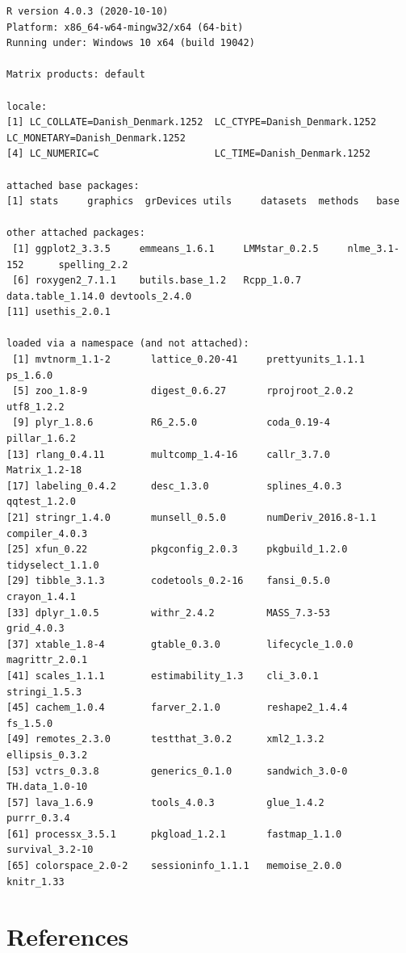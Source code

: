 \documentclass[12pt]{article}
\begin{document}
\begin{verbatim}
R version 4.0.3 (2020-10-10)
Platform: x86_64-w64-mingw32/x64 (64-bit)
Running under: Windows 10 x64 (build 19042)

Matrix products: default

locale:
[1] LC_COLLATE=Danish_Denmark.1252  LC_CTYPE=Danish_Denmark.1252    LC_MONETARY=Danish_Denmark.1252
[4] LC_NUMERIC=C                    LC_TIME=Danish_Denmark.1252    

attached base packages:
[1] stats     graphics  grDevices utils     datasets  methods   base     

other attached packages:
 [1] ggplot2_3.3.5     emmeans_1.6.1     LMMstar_0.2.5     nlme_3.1-152      spelling_2.2     
 [6] roxygen2_7.1.1    butils.base_1.2   Rcpp_1.0.7        data.table_1.14.0 devtools_2.4.0   
[11] usethis_2.0.1    

loaded via a namespace (and not attached):
 [1] mvtnorm_1.1-2       lattice_0.20-41     prettyunits_1.1.1   ps_1.6.0           
 [5] zoo_1.8-9           digest_0.6.27       rprojroot_2.0.2     utf8_1.2.2         
 [9] plyr_1.8.6          R6_2.5.0            coda_0.19-4         pillar_1.6.2       
[13] rlang_0.4.11        multcomp_1.4-16     callr_3.7.0         Matrix_1.2-18      
[17] labeling_0.4.2      desc_1.3.0          splines_4.0.3       qqtest_1.2.0       
[21] stringr_1.4.0       munsell_0.5.0       numDeriv_2016.8-1.1 compiler_4.0.3     
[25] xfun_0.22           pkgconfig_2.0.3     pkgbuild_1.2.0      tidyselect_1.1.0   
[29] tibble_3.1.3        codetools_0.2-16    fansi_0.5.0         crayon_1.4.1       
[33] dplyr_1.0.5         withr_2.4.2         MASS_7.3-53         grid_4.0.3         
[37] xtable_1.8-4        gtable_0.3.0        lifecycle_1.0.0     magrittr_2.0.1     
[41] scales_1.1.1        estimability_1.3    cli_3.0.1           stringi_1.5.3      
[45] cachem_1.0.4        farver_2.1.0        reshape2_1.4.4      fs_1.5.0           
[49] remotes_2.3.0       testthat_3.0.2      xml2_1.3.2          ellipsis_0.3.2     
[53] vctrs_0.3.8         generics_0.1.0      sandwich_3.0-0      TH.data_1.0-10     
[57] lava_1.6.9          tools_4.0.3         glue_1.4.2          purrr_0.3.4        
[61] processx_3.5.1      pkgload_1.2.1       fastmap_1.1.0       survival_3.2-10    
[65] colorspace_2.0-2    sessioninfo_1.1.1   memoise_2.0.0       knitr_1.33
\end{verbatim}

\clearpage

\section*{References}
\label{sec:org93c6df8}
\begingroup
\renewcommand{\section}[2]{}
\end{document}
